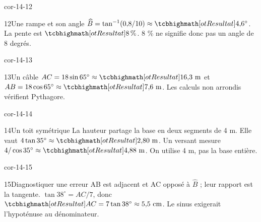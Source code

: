 \begin{blocLivre}{cor-14-12}\begin{corrige}{12}{Une rampe et son angle}
$\widehat B=\tan^{-1}(0{,}8/10)\approx\res{4{,}6^\circ}$. La pente est $\res{8\,\%}$. 8 \% ne signifie donc pas un angle de 8 degrés.
\label{fig-cor-14-12}
\end{corrige}\end{blocLivre}
\begin{blocLivre}{cor-14-13}\begin{corrige}{13}{Un câble}
$AC=18\sin65^\circ\approx\res{16{,}3\text{ m}}$ et $AB=18\cos65^\circ\approx\res{7{,}6\text{ m}}$. Les calculs non arrondis vérifient Pythagore.
\label{fig-cor-14-13}
\end{corrige}\end{blocLivre}
\begin{blocLivre}{cor-14-14}\begin{corrige}{14}{Un toit symétrique}
La hauteur partage la base en deux segments de 4 m. Elle vaut $4\tan35^\circ\approx\res{2{,}80\text{ m}}$. Un versant mesure $4/\cos35^\circ\approx\res{4{,}88\text{ m}}$. On utilise 4 m, pas la base entière.
\label{fig-cor-14-14}
\end{corrige}\end{blocLivre}
\begin{blocLivre}{cor-14-15}\begin{corrige}{15}{Diagnostiquer une erreur}
AB est adjacent et AC opposé à $\widehat B$ ; leur rapport est la tangente. $\tan38^\circ=AC/7$, donc $\res{AC=7\tan38^\circ\approx5{,}5\text{ cm}}$. Le sinus exigerait l’hypoténuse au dénominateur.
\label{fig-cor-14-15}
\end{corrige}\end{blocLivre}

